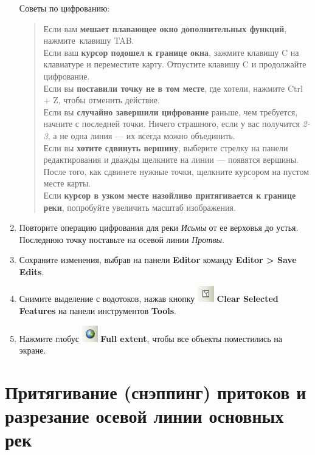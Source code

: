 \documentclass[12pt,]{book}
\begin{document}
\begin{enumerate}
  Советы по цифрованию:

  \begin{quote}
  Если вам \textbf{мешает плавающее окно дополнительных функций}, нажмите~клавишу TAB.\\
  Если ваш \textbf{курсор подошел к границе окна}, зажмите клавишу C на клавиатуре и переместите карту. Отпустите клавишу C и продолжайте цифрование.\\
  Если вы \textbf{поставили точку не в том месте}, где хотели, нажмите Ctrl + Z, чтобы отменить действие.\\
  Если вы \textbf{случайно завершили цифрование} раньше, чем требуется, начните с последней точки. Ничего страшного, если у вас получится \emph{2-3}, а не одна линия --- их всегда можно объединить.\\
  Если вы \textbf{хотите сдвинуть вершину}, выберите стрелку на панели редактирования и дважды щелкните на линии --- появятся вершины. После того, как сдвинете нужные точки, щелкните курсором на пустом месте карты.\\
  Если \textbf{курсор в узком месте назойливо притягивается к границе реки}, попробуйте увеличить масштаб изображения.
  \end{quote}
\item
  Повторите операцию цифрования для реки \emph{Исьмы} от ее верховья до устья. Последнюю точку поставьте на осевой линии \emph{Протвы}.
\item
  Сохраните изменения, выбрав на панели \textbf{Editor} команду \textbf{Editor \textgreater{} Save Edits}.
\item
  Снимите выделение с водотоков, нажав кнопку \includegraphics{images/Ex13/image10.png} \textbf{Clear Selected Features} на панели инструментов \textbf{Tools}.
\item
  Нажмите глобус \includegraphics{images/Ex13/image14.png} \textbf{Full extent}, чтобы все объекты поместились на экране.
\end{enumerate}

\hypertarget{section-4}{%
\section{Притягивание (снэппинг) притоков и разрезание осевой линии основных рек}\label{section-4}}
\end{document}
